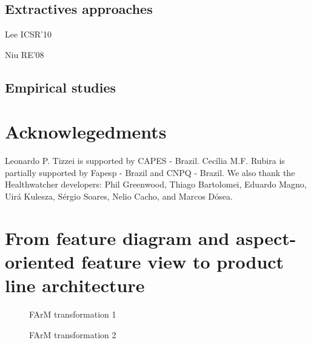 \documentclass[11pt,twoside]{article}
\begin{document}
\subsection{Extractives approaches}

Lee ICSR'10

Niu RE'08



\subsection{Empirical studies}

\section*{Acknowlegedments}
Leonardo P. Tizzei is supported by CAPES - Brazil. Cec\'{i}lia M.F. Rubira is partially supported by Fapesp - Brazil and CNPQ - Brazil. We
also thank the Healthwatcher developers: Phil Greenwood, Thiago Bartolomei, Eduardo Magno, Uir\'{a} Kulesza, S\'{e}rgio Soares, Nelio
Cacho, and Marcos D\'{o}sea.



\appendix

\section{From feature diagram and aspect-oriented feature view to product line architecture}
\label{sec:app-farm}

\begin{figure}[h!t!b!]
   \centering
   \caption{FArM transformation 1}
   \label{fig:step1}
\end{figure}

\begin{figure}[h!t!b!]
   \centering
   \caption{FArM transformation 2}
   \label{fig:step2}
\end{figure}
\end{document}
